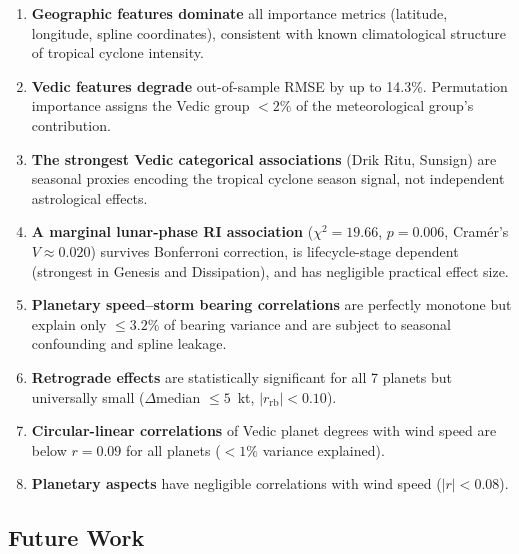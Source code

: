 \documentclass[12pt,a4paper]{article}
\begin{document}
    \begin{enumerate}[noitemsep]
    \item \textbf{Geographic features dominate} all importance metrics (latitude,
            longitude, spline coordinates), consistent with known climatological
            structure of tropical cyclone intensity.
    \item \textbf{Vedic features degrade} out-of-sample RMSE by up to 14.3\%.
            Permutation importance assigns the Vedic group $<2\%$ of the
            meteorological group's contribution.
    \item \textbf{The strongest Vedic categorical associations} (Drik Ritu,
            Sunsign) are seasonal proxies encoding the tropical cyclone season
            signal, not independent astrological effects.
    \item \textbf{A marginal lunar-phase RI association} ($\chi^2 = 19.66$,
            $p = 0.006$, Cram\'er's $V \approx 0.020$) survives Bonferroni
            correction, is lifecycle-stage dependent (strongest in Genesis and
            Dissipation), and has negligible practical effect size.
    \item \textbf{Planetary speed--storm bearing correlations} are perfectly
            monotone but explain only $\leq 3.2\%$ of bearing variance and are
            subject to seasonal confounding and spline leakage.
    \item \textbf{Retrograde effects} are statistically significant for all 7
            planets but universally small ($\Delta$median $\leq 5$~kt,
            $|r_{\text{rb}}| < 0.10$).
    \item \textbf{Circular-linear correlations} of Vedic planet degrees with
            wind speed are below $r = 0.09$ for all planets ($< 1\%$ variance
            explained).
    \item \textbf{Planetary aspects} have negligible correlations with wind speed
            ($|r| < 0.08$).
    \end{enumerate}

    \subsection{Future Work}
\end{document}
